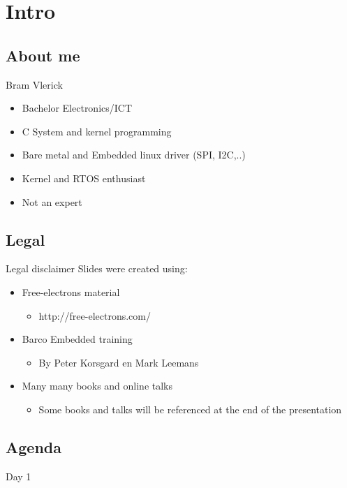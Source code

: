 \section{Intro}
\subsection{About me}
\begin{frame}{Bram Vlerick}
\begin{itemize}
\item Bachelor Electronics/ICT
\item C System and kernel programming
\item Bare metal and Embedded linux driver (SPI, I2C,..)
\item Kernel and RTOS enthusiast
\item Not an expert
\end{itemize}
\end{frame}

\subsection{Legal}
\begin{frame}{Legal disclaimer}
Slides were created using:
\begin{itemize}
\item Free-electrons material
\begin{itemize}
\item http://free-electrons.com/
\end{itemize}
\item Barco Embedded training
\begin{itemize}
\item By Peter Korsgard en Mark Leemans
\end{itemize}
\item Many many books and online talks
\begin{itemize}
\item Some books and talks will be referenced at the end of the presentation
\end{itemize}
\end{itemize}
\end{frame}

\subsection{Agenda}
\begin{frame}{Day 1}
\end{frame}
